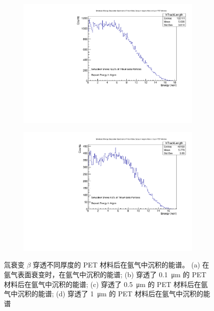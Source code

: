 \begin{figure}[htbp]
	\begin{subfigure}[b]{0.45\textwidth}
		\includegraphics[width=\textwidth]{figures/05Edep.pdf}
		\caption{}
		\label{fig:05Edep}
	\end{subfigure}
	\hfill
	\begin{subfigure}[b]{0.45\textwidth}
		\includegraphics[width=\textwidth]{figures/10Edep.pdf}
		\caption{}
		\label{fig:10Edep}
	\end{subfigure}
	\caption{氚衰变 $\beta$ 穿透不同厚度的 PET 材料后在氩气中沉积的能谱。 (a) 在氩气表面衰变时，在氩气中沉积的能谱; (b) 穿透了 \SI{0.1}{\micro\meter} 的 PET 材料后在氩气中沉积的能谱; (c) 穿透了 \SI{0.5}{\micro\meter} 的 PET 材料后在氩气中沉积的能谱; (d) 穿透了 \SI{1}{\micro\meter} 的 PET 材料后在氩气中沉积的能谱}
	\label{fig:Edep}
\end{figure}

